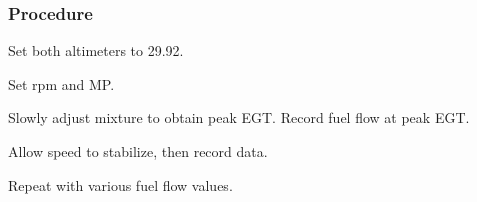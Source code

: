 % 
% 
%
 \subsubsection*{Procedure}
 \begin{compactenum}
   \item Set both altimeters to 29.92.
   \item Set rpm and MP.
   \item Slowly adjust mixture to obtain peak EGT.  Record fuel flow at peak EGT.
   \item Allow speed to stabilize, then record data.
   \item Repeat with various fuel flow values.
   \end{compactenum}